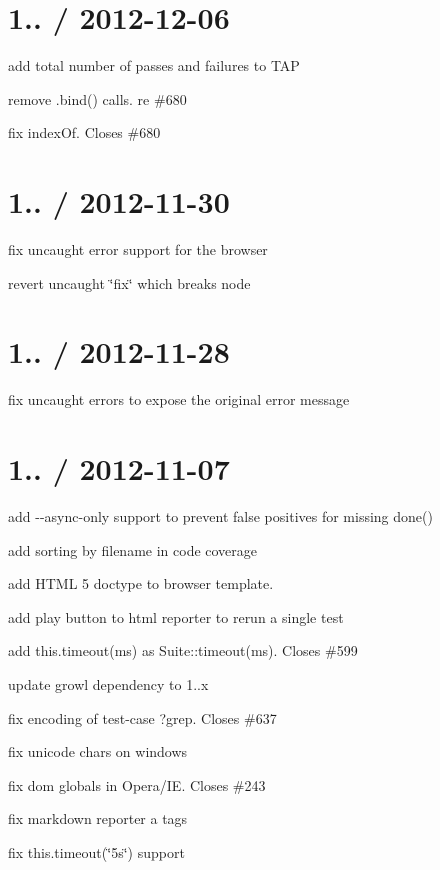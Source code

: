 \section*{1.. / 2012-\/12-\/06}


\begin{DoxyItemize}
\item add total number of passes and failures to T\+AP
\item remove .bind() calls. re \#680
\item fix index\+Of. Closes \#680
\end{DoxyItemize}

\section*{1.. / 2012-\/11-\/30}


\begin{DoxyItemize}
\item fix uncaught error support for the browser
\item revert uncaught \char`\"{}fix\char`\"{} which breaks node
\end{DoxyItemize}

\section*{1.. / 2012-\/11-\/28}


\begin{DoxyItemize}
\item fix uncaught errors to expose the original error message
\end{DoxyItemize}

\section*{1.. / 2012-\/11-\/07}


\begin{DoxyItemize}
\item add {\ttfamily -\/-\/async-\/only} support to prevent false positives for missing {\ttfamily done()}
\item add sorting by filename in code coverage
\item add H\+T\+ML 5 doctype to browser template.
\item add play button to html reporter to rerun a single test
\item add {\ttfamily this.\+timeout(ms)} as Suite\+::timeout(ms). Closes \#599
\item update growl dependency to 1..\+x
\item fix encoding of test-\/case ?grep. Closes \#637
\item fix unicode chars on windows
\item fix dom globals in Opera/\+IE. Closes \#243
\item fix markdown reporter a tags
\item fix {\ttfamily this.\+timeout(\char`\"{}5s\char`\"{})} support
\end{DoxyItemize}

